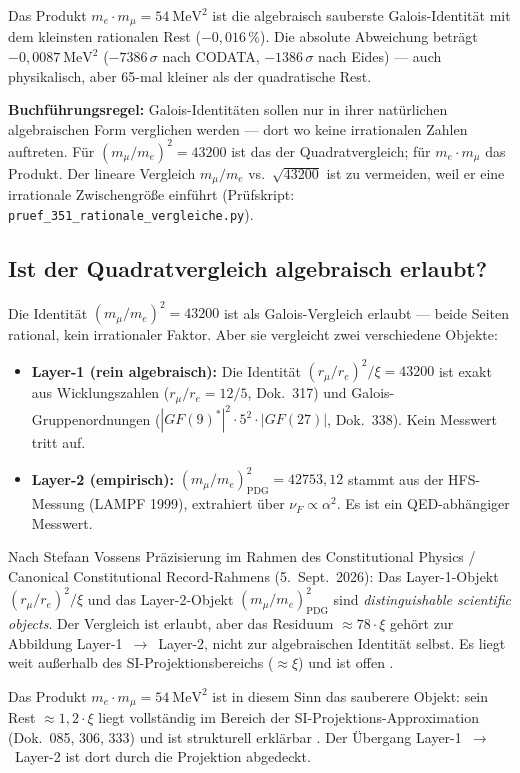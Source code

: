 Das Produkt $m_e\cdot m_\mu = 54~\text{MeV}^2$ ist die algebraisch sauberste
Galois-Identität mit dem kleinsten rationalen Rest ($-0{,}016\,\%$). Die absolute
Abweichung beträgt $-0{,}0087~\text{MeV}^2$ ($-7386\,\sigma$ nach CODATA, $-1386\,\sigma$ nach Eides) --- auch physikalisch,
aber 65-mal kleiner als der quadratische Rest.

\textbf{Buchführungsregel:} Galois-Identitäten sollen nur in ihrer natürlichen
algebraischen Form verglichen werden --- dort wo keine irrationalen Zahlen auftreten.
Für $(m_\mu/m_e)^2 = 43200$ ist das der Quadratvergleich; für $m_e\cdot m_\mu$
das Produkt. Der lineare Vergleich $m_\mu/m_e$ vs.\ $\sqrt{43200}$ ist zu vermeiden,
weil er eine irrationale Zwischengröße einführt
(Prüfskript: \texttt{pruef\_351\_rationale\_vergleiche.py}).


\subsection*{Ist der Quadratvergleich algebraisch erlaubt?}

Die Identität $(m_\mu/m_e)^2=43200$ ist als Galois-Vergleich erlaubt --- beide
Seiten rational, kein irrationaler Faktor. Aber sie vergleicht zwei
verschiedene Objekte:

\begin{itemize}\itemsep2pt
\item \textbf{Layer-1 (rein algebraisch):} Die Identität
  $(r_\mu/r_e)^2/\xi=43200$ ist exakt aus Wicklungszahlen ($r_\mu/r_e=12/5$,
  Dok.~317) und Galois-Gruppenordnungen ($|GF(9)^*|^2\cdot5^2\cdot|GF(27)|$,
  Dok.~338). Kein Messwert tritt auf.
\item \textbf{Layer-2 (empirisch):} $(m_\mu/m_e)^2_\text{PDG}=42753{,}12$
  stammt aus der HFS-Messung (LAMPF 1999), extrahiert über $\nu_F\propto\alpha^2$.
  Es ist ein QED-abhängiger Messwert.
\end{itemize}

Nach Stefaan Vossens Präzisierung im Rahmen des Constitutional Physics / Canonical Constitutional Record-Rahmens (5.~Sept.~2026): Das Layer-1-Objekt
$(r_\mu/r_e)^2/\xi$ und das Layer-2-Objekt $(m_\mu/m_e)^2_\text{PDG}$ sind
\emph{distinguishable scientific objects}. Der Vergleich ist erlaubt, aber das
Residuum $\approx78\cdot\xi$ gehört zur Abbildung Layer-1~$\to$~Layer-2,
nicht zur algebraischen Identität selbst. Es liegt weit außerhalb des
SI-Projektionsbereichs ($\approx\xi$) und ist offen \SM.

Das Produkt $m_e\cdot m_\mu=54~\text{MeV}^2$ ist in diesem Sinn das sauberere
Objekt: sein Rest $\approx1{,}2\cdot\xi$ liegt vollständig im Bereich der
SI-Projektions-Approximation (Dok.~085, 306, 333) und ist strukturell erklärbar \KM.
Der Übergang Layer-1~$\to$~Layer-2 ist dort durch die Projektion abgedeckt.






